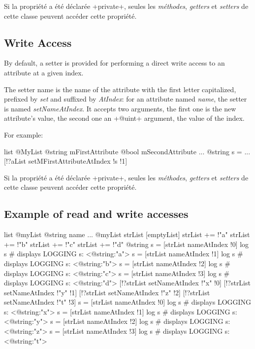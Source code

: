 Si la propriété a été déclarée \ggst+private+, seules les \emph{méthodes}, \emph{getters} et \emph{setters} de cette classe peuvent accéder cette propriété.



\subsection{Write Access}

By default, a setter is provided for performing a direct write access to an attribute at a given index.

The setter name is the name of the attribute with the first letter capitalized, prefixed by \emph{set} and suffixed by \emph{AtIndex}: for an attribute named \emph{name}, the setter is named \emph{setNameAtIndex}. It accepts two arguments, the first one is the new attribute's value, the second one an \ggst+@uint+ argument, the value of the index.

For example:

\begin{galgas3}
list @MyList {
  @string mFirstAttribute
  @bool mSecondAttribute
}
...
@string s = ...
[!?aList setMFirstAttributeAtIndex !s !1]
\end{galgas3}

Si la propriété a été déclarée \ggst+private+, seules les \emph{méthodes}, \emph{getters} et \emph{setters} de cette classe peuvent accéder cette propriété.


\subsection{Example of read and write accesses}

\begin{galgas3}
list @myList {
  @string name
}
...
@myList strList [emptyList]
strList += !"a"
strList += !"b"
strList += !"c"
strList += !"d"
@string s = [strList nameAtIndex !0]
log s # displays LOGGING s: <@string:"a">
s = [strList nameAtIndex !1]
log s # displays LOGGING s: <@string:"b">
s = [strList nameAtIndex !2]
log s # displays LOGGING s: <@string:"c">
s = [strList nameAtIndex !3]
log s # displays LOGGING s: <@string:"d">
[!?strList setNameAtIndex !"x" !0]
[!?strList setNameAtIndex !"y" !1]
[!?strList setNameAtIndex !"z" !2]
[!?strList setNameAtIndex !"t" !3]
s = [strList nameAtIndex !0]
log s # displays LOGGING s: <@string:"x">
s = [strList nameAtIndex !1]
log s # displays LOGGING s: <@string:"y">
s = [strList nameAtIndex !2]
log s # displays LOGGING s: <@string:"z">
s = [strList nameAtIndex !3]
log s # displays LOGGING s: <@string:"t">
\end{galgas3}


